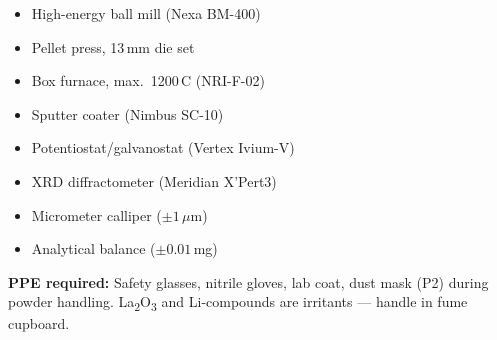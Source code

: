\begin{tcolorbox}[notebox, title={\faFlask\quad Materials \& Equipment}]
  \vspace{4pt}
  \begin{minipage}[t]{0.48\linewidth}
    \begin{itemize}[leftmargin=14pt, itemsep=1.5pt, topsep=0pt]
      \item[\faCheckCircle] High-energy ball mill (Nexa BM-400)
      \item[\faCheckCircle] Pellet press, 13\,mm die set
      \item[\faCheckCircle] Box furnace, max.\ 1200\,\textdegree C (NRI-F-02)
      \item[\faCheckCircle] Sputter coater (Nimbus SC-10)
    \end{itemize}
  \end{minipage}%
  \hfill
  \begin{minipage}[t]{0.48\linewidth}
    \begin{itemize}[leftmargin=14pt, itemsep=1.5pt, topsep=0pt]
      \item[\faCheckCircle] Potentiostat/galvanostat (Vertex Ivium-V)
      \item[\faCheckCircle] XRD diffractometer (Meridian X'Pert3)
      \item[\faCheckCircle] Micrometer calliper ($\pm 1\,\mu$m)
      \item[\faCheckCircle] Analytical balance ($\pm 0.01$\,mg)
    \end{itemize}
  \end{minipage}

  \vspace{8pt}
  {\footnotesize\color{Graphite}
    \textbf{PPE required:} Safety glasses, nitrile gloves, lab coat, dust mask (P2)
    during powder handling.\quad
    \faExclamationTriangle\;La\textsubscript{2}O\textsubscript{3} and Li-compounds are
    irritants --- handle in fume cupboard.
  }

\end{tcolorbox}
